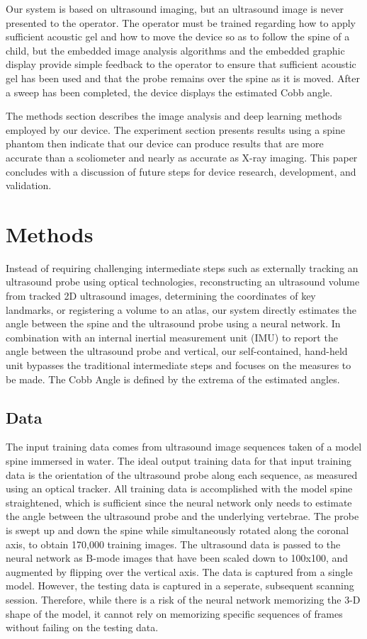 \documentclass{article}
\begin{document}
Our system is based on ultrasound imaging, but an ultrasound image is never presented to the operator.  The operator must be trained regarding how to apply sufficient acoustic gel and how to move the device so as to follow the spine of a child, but the embedded image analysis algorithms and the embedded graphic display provide simple feedback to the operator to ensure that sufficient acoustic gel has been used and that the probe remains over the spine as it is moved.  After a sweep has been completed, the device displays the estimated Cobb angle.

The methods section describes the image analysis and deep learning methods employed by our device.  The experiment section presents results using a spine phantom then indicate that our device can produce results that are more accurate than a scoliometer and nearly as accurate as X-ray imaging.  This paper concludes with a discussion of future steps for device research, development, and validation.

\section{Methods}
\label{sec:methods}

Instead of requiring challenging intermediate steps such as externally tracking an ultrasound probe using optical technologies, reconstructing an ultrasound volume from tracked 2D ultrasound images, determining the coordinates of key landmarks, or registering a volume to an atlas, our system directly estimates the angle between the spine and the ultrasound probe using a neural network. In combination with an internal inertial measurement unit (IMU) to report the angle between the ultrasound probe and vertical, our self-contained, hand-held unit bypasses the traditional intermediate steps and focuses on the measures to be made. The Cobb Angle is defined by the extrema of the estimated angles.

\subsection{Data}
\label{ssec:Data}
The input training data comes from ultrasound image sequences taken of a model spine immersed in water. The ideal output training data for that input training data is the orientation of the ultrasound probe along each sequence, as measured using an optical tracker.  All training data is accomplished with the model spine straightened, which is sufficient since the neural network only needs to estimate the angle between the ultrasound probe and the underlying vertebrae. The probe is swept up and down the spine while simultaneously rotated along the coronal axis, to obtain 170,000 training images. The ultrasound data is passed to the neural network as B-mode images that have been scaled down to 100x100, and augmented by flipping over the vertical axis. The data is captured from a single model. However, the testing data is captured in a seperate, subsequent scanning session. Therefore, while there is a risk of the neural network memorizing the 3-D shape of the model, it cannot rely on memorizing specific sequences of frames without failing on the testing data.
\end{document}

